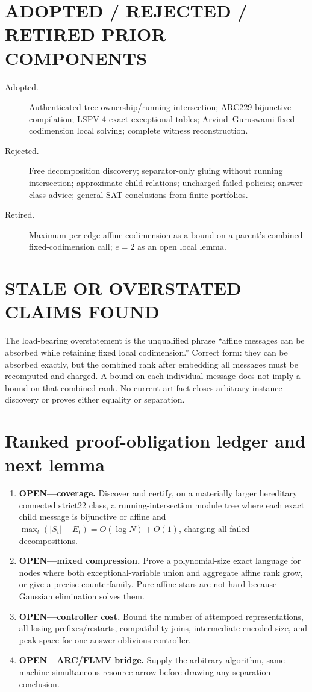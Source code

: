 \documentclass[11pt]{article}
\begin{document}
\section{ADOPTED / REJECTED / RETIRED PRIOR COMPONENTS}
\begin{description}
\item[Adopted.] Authenticated tree ownership/running intersection; ARC229
bijunctive compilation; LSPV-4 exact exceptional tables; Arvind--Guruswami
fixed-codimension local solving; complete witness reconstruction.
\item[Rejected.] Free decomposition discovery; separator-only gluing without
running intersection; approximate child relations; uncharged failed policies;
answer-class advice; general SAT conclusions from finite portfolios.
\item[Retired.] Maximum per-edge affine codimension as a bound on a parent's
combined fixed-codimension call; $e=2$ as an open local lemma.
\end{description}

\section{STALE OR OVERSTATED CLAIMS FOUND}
The load-bearing overstatement is the unqualified phrase ``affine messages
can be absorbed while retaining fixed local codimension.''  Correct form:
they can be absorbed exactly, but the combined rank after embedding all
messages must be recomputed and charged.  A bound on each individual message
does not imply a bound on that combined rank.  No current artifact closes
arbitrary-instance discovery or proves either equality or separation.

\section{Ranked proof-obligation ledger and next lemma}
\begin{enumerate}
\item \textbf{OPEN---coverage.}  Discover and certify, on a materially larger
hereditary connected strict22 class, a running-intersection module tree where
each exact child message is bijunctive or affine and
$\max_t(|S_t|+E_t)=O(\log N)+O(1)$, charging all failed decompositions.
\item \textbf{OPEN---mixed compression.}  Prove a polynomial-size exact
language for nodes where both exceptional-variable union and aggregate
affine rank grow, or give a precise counterfamily.  Pure affine stars are not
hard because Gaussian elimination solves them.
\item \textbf{OPEN---controller cost.}  Bound the number of attempted
representations, all losing prefixes/restarts, compatibility joins,
intermediate encoded size, and peak space for one answer-oblivious controller.
\item \textbf{OPEN---ARC/FLMV bridge.}  Supply the arbitrary-algorithm,
same-machine simultaneous resource arrow before drawing any separation
conclusion.
\end{enumerate}
\end{document}
